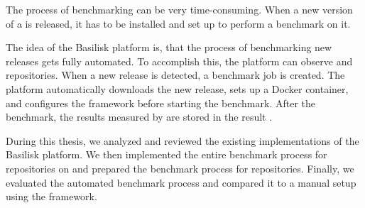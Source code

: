 The process of benchmarking \tsp{} can be very time-consuming.
When a new version of a \ts{} is released, it has to be installed and set up to perform a benchmark on it.

The idea of the Basilisk platform is, that the process of benchmarking new \ts{} releases gets fully automated.
To accomplish this, the platform can observe \dockh{} and \gh{} repositories.
When a new release is detected, a benchmark job is created.
The platform automatically downloads the new release, sets up a Docker container, and configures the \iguana{} framework before starting the benchmark.
After the benchmark, the results measured by \iguana{} are stored in the result \ts{}.

During this thesis, we analyzed and reviewed the existing implementations of the Basilisk platform.
We then implemented the entire benchmark process for repositories on \dockh{} and prepared the benchmark process for \gh{} repositories.
Finally, we evaluated the automated benchmark process and compared it to a manual setup using the \iguana{} framework.

